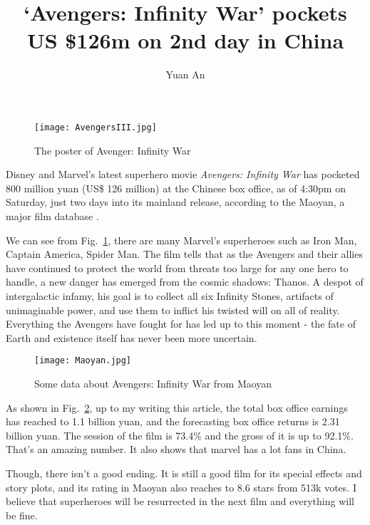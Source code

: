 \documentclass[a4paper,12pt,twocolumn]{article}
\title{`Avengers: Infinity War' pockets US \$126m on 2nd day in China}
\author{Yuan An}
\begin{document}
\maketitle
\begin{figure}[h]
	\centering
	\texttt{[image: AvengersIII.jpg]}
	\caption{The poster of Avenger: Infinity War}\label{poster}
\end{figure}
Disney and Marvel's latest superhero movie \emph{Avengers: Infinity War} has pocketed 800 million yuan (US\$ 126 million) at the Chinese box office, as of 4:30pm on Saturday, just two days into its mainland release, according to the Maoyan, a major film database \cite{ShineNews}.
\par
We can see from Fig.~\ref{poster}, there are many Marvel's superheroes such as Iron Man, Captain America, Spider Man. The film tells that as the Avengers and their allies have continued to protect the world from threats too large for any one hero to handle, a new danger has emerged from the cosmic shadows: Thanos. A despot of intergalactic infamy, his goal is to collect all six Infinity Stones, artifacts of unimaginable power, and use them to inflict his twisted will on all of reality. Everything the Avengers have fought for has led up to this moment - the fate of Earth and existence itself has never been more uncertain.
\begin{figure}[h]
	\centering
	\texttt{[image: Maoyan.jpg]}
	\caption{Some data about Avengers: Infinity War from Maoyan}\label{Maoyan}
\end{figure}
\par
As shown in Fig.~\ref{Maoyan}, up to my writing this article, the total box office earnings has reached to 1.1 billion yuan, and the forecasting box office returns is 2.31 billion yuan.  The session of the film is 73.4\% and the gross of it is up to 92.1\%. That's an amazing number. It also shows that marvel has a lot fans in China.
\par
Though, there isn't a good ending. It is still a good film for its special effects and story plots, and its rating in Maoyan also reaches to 8.6 stars from 513k votes. I believe that superheroes will be resurrected in the next film and everything will be fine.


\end{document}
